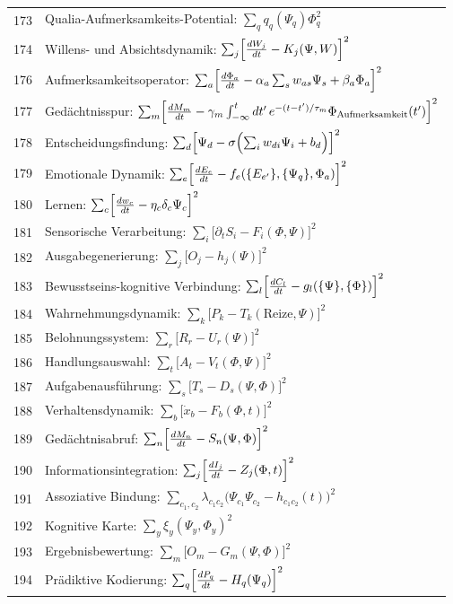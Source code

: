 \documentclass[11pt,a4paper]{article}
\begin{document}
\begin{longtable}{r l}
		173 & Qualia-Aufmerksamkeits-Potential: $\sum_q q_q(\Psi_q)\Phi_q^2$ \\
		174 & Willens- und Absichtsdynamik: $\sum_j\Bigl[\frac{dW_j}{dt} - K_j(\Psi,W)\Bigr]^2$ \\
		176 & Aufmerksamkeitsoperator: $\sum_a\Bigl[\frac{d\Phi_a}{dt} - \alpha_a\sum_s w_{as}\Psi_s + \beta_a\Phi_a\Bigr]^2$ \\
		177 & Gedächtnisspur: $\sum_m\Bigl[\frac{dM_m}{dt} - \gamma_m\int_{-\infty}^t dt'\,e^{-(t-t')/\tau_m}\Phi_{\text{Aufmerksamkeit}}(t')\Bigr]^2$ \\
		178 & Entscheidungsfindung: $\sum_d\Bigl[\Psi_d - \sigma\Bigl(\sum_i w_{di}\Psi_i + b_d\Bigr)\Bigr]^2$ \\
		179 & Emotionale Dynamik: $\sum_e\Bigl[\frac{dE_e}{dt} - f_e(\{E_{e'}\},\{\Psi_q\},\Phi_a)\Bigr]^2$ \\
		180 & Lernen: $\sum_c\Bigl[\frac{dw_c}{dt} - \eta_c\delta_c\Psi_c\Bigr]^2$ \\
		181 & Sensorische Verarbeitung: $\sum_i\bigl[\partial_t S_i - F_i(\Phi,\Psi)\bigr]^2$ \\
		182 & Ausgabegenerierung: $\sum_j\bigl[O_j - h_j(\Psi)\bigr]^2$ \\
		183 & Bewusstseins-kognitive Verbindung: $\sum_l\Bigl[\frac{dC_l}{dt} - g_l(\{\Psi\},\{\Phi\})\Bigr]^2$ \\
		184 & Wahrnehmungsdynamik: $\sum_k\bigl[P_k - T_k(\text{Reize},\Psi)\bigr]^2$ \\
		185 & Belohnungssystem: $\sum_r\bigl[R_r - U_r(\Psi)\bigr]^2$ \\
		186 & Handlungsauswahl: $\sum_t\bigl[A_t - V_t(\Phi,\Psi)\bigr]^2$ \\
		187 & Aufgabenausführung: $\sum_s\bigl[T_s - D_s(\Psi,\Phi)\bigr]^2$ \\
		188 & Verhaltensdynamik: $\sum_b\bigl[\dot x_b - F_b(\Phi,t)\bigr]^2$ \\
		189 & Gedächtnisabruf: $\sum_n\Bigl[\frac{dM_n}{dt} - S_n(\Psi,\Phi)\Bigr]^2$ \\
		190 & Informationsintegration: $\sum_j\Bigl[\frac{dI_j}{dt} - Z_j(\Phi,t)\Bigr]^2$ \\
		191 & Assoziative Bindung: $\sum_{c_1,c_2}\lambda_{c_1c_2}\bigl(\Psi_{c_1}\Psi_{c_2} - h_{c_1c_2}(t)\bigr)^2$ \\
		192 & Kognitive Karte: $\sum_y\xi_y(\Psi_y,\Phi_y)^2$ \\
		193 & Ergebnisbewertung: $\sum_m\bigl[O_m - G_m(\Psi,\Phi)\bigr]^2$ \\
		194 & Prädiktive Kodierung: $\sum_q\Bigl[\frac{dP_q}{dt} - H_q(\Psi_q)\Bigr]^2$ \\

\end{longtable}
\end{document}
